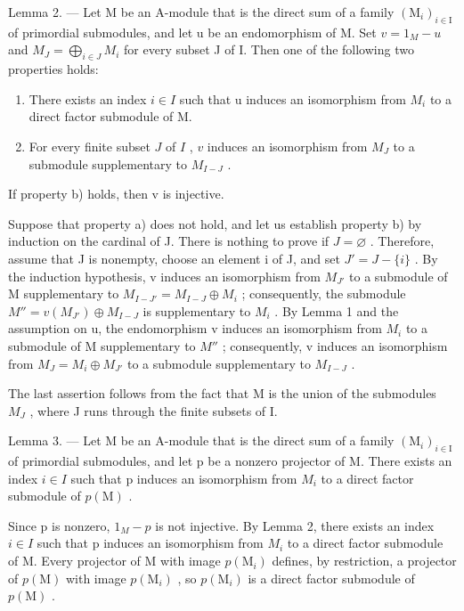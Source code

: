 Lemma 2. --- Let M be an A-module that is the direct sum of a family \((\mathrm{M}_{i})_{i\in\mathrm{I}}\) of primordial submodules, and let u be an endomorphism of M. Set \(v=1_{M}-u\) and \(M_{J}=\bigoplus_{i\in J}M_{i}\) for every subset J of I. Then one of the following two properties holds:

\begin{enumerate}
\def\labelenumi{\alph{enumi})}
\item
  There exists an index \(i \in I\) such that u induces an isomorphism from \(M_{i}\) to a direct factor submodule of M.
\item
  For every finite subset \(J\) of \(I\) , \(v\) induces an isomorphism from \(M_J\) to a submodule supplementary to \(M_{I-J}\) .
\end{enumerate}

If property b) holds, then v is injective.

Suppose that property a) does not hold, and let us establish property b) by induction on the cardinal of J. There is nothing to prove if \(J = \varnothing\) . Therefore, assume that J is nonempty, choose an element i of J, and set \(J' = J - \{i\}\) . By the induction hypothesis, v induces an isomorphism from \(M_{J'}\) to a submodule of M supplementary to \(M_{I-J'} = M_{I-J} \oplus M_i\) ; consequently, the submodule \(M'' = v(M_{J'}) \oplus M_{I-J}\) is supplementary to \(M_i\) . By Lemma 1 and the assumption on u, the endomorphism v induces an isomorphism from \(M_i\) to a submodule of M supplementary to \(M''\) ; consequently, v induces an isomorphism from \(M_J = M_i \oplus M_{J'}\) to a submodule supplementary to \(M_{I-J}\) .

The last assertion follows from the fact that M is the union of the submodules \(M_{J}\) , where J runs through the finite subsets of I.

Lemma 3. --- Let M be an A-module that is the direct sum of a family \((\mathrm{M}_{i})_{i\in\mathrm{I}}\) of primordial submodules, and let p be a nonzero projector of M. There exists an index \(i\in I\) such that p induces an isomorphism from \(M_{i}\) to a direct factor submodule of \(p(\mathrm{M})\) .

Since p is nonzero, \(1_{M} - p\) is not injective. By Lemma 2, there exists an index \(i \in I\) such that p induces an isomorphism from \(M_{i}\) to a direct factor submodule of M. Every projector of M with image \(p(\mathrm{M}_{i})\) defines, by restriction, a projector of \(p(\mathrm{M})\) with image \(p(\mathrm{M}_{i})\) , so \(p(\mathrm{M}_{i})\) is a direct factor submodule of \(p(\mathrm{M})\) .

